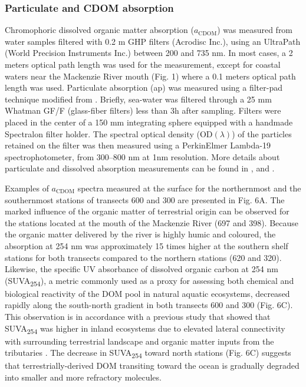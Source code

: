 \documentclass[essd, manuscript]{copernicus}
\begin{document}
\subsubsection{Particulate and CDOM absorption}

Chromophoric dissolved organic matter absorption ($a_\text{CDOM}$) was measured from water samples filtered with 0.2 \textmu m GHP filters (Acrodisc Inc.), using an UltraPath (World Precision Instruments Inc.) between 200 and 735 nm. In most cases, a 2 meters optical path length was used for the measurement, except for coastal waters near the Mackenzie River mouth (Fig. 1) where a 0.1 meters optical path length was used. Particulate absorption (ap) was measured using a filter-pad technique modified from \citet{Rottgers2012}. Briefly, sea-water was filtered through a 25 mm Whatman GF/F (glass-fiber filters) less than 3h after sampling. Filters were placed in the center of a 150 mm integrating sphere equipped with a handmade Spectralon filter holder. The spectral optical density ($\text{OD}(\lambda)$) of the particles retained on the filter was then measured using a PerkinElmer Lambda-19 spectrophotometer, from 300–800 nm at 1nm resolution. More details about particulate and dissolved absorption measurements can be found in \citet{Rottgers2012}, \citet{Belanger2013b} and \citet{Matsuoka2012}.

Examples of $a_\text{CDOM}$ spectra measured at the surface for the northernmost and the southernmost stations of transects 600 and 300 are presented in Fig. 6A. The marked influence of the organic matter of terrestrial origin can be observed for the stations located at the mouth of the Mackenzie River (697 and 398). Because the organic matter delivered by the river is highly humic and coloured, the absorption at 254 nm was approximately 15 times higher at the southern shelf stations for both transects  compared to the northern stations (620 and 320). Likewise, the specific UV absorbance of dissolved organic carbon at 254 nm (SUVA\textsubscript{254}), a metric commonly used as a proxy for assessing both chemical \citep{weishaar2003, westerhoff2004} and biological reactivity \citep{berggren2009, asmala2013} of the DOM pool in natural aquatic ecosystems, decreased rapidly along the south-north gradient in both transects 600 and 300 (Fig. 6C). This observation is in accordance with a previous study that showed that SUVA\textsubscript{254} was higher in inland ecosystems due to elevated lateral connectivity with surrounding terrestrial landscape and organic matter inputs from the tributaries \citep{Massicotte2017}. The decrease in SUVA\textsubscript{254} toward north stations (Fig. 6C) suggests that terrestrially-derived DOM transiting toward the ocean is gradually degraded into smaller and more refractory molecules.
\end{document}
